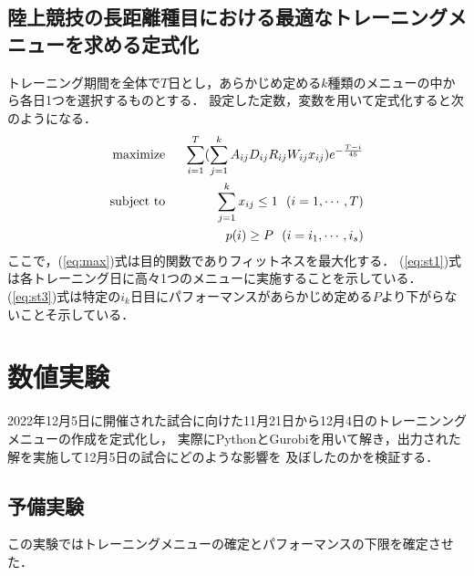 \documentclass[12pt,fleqn]{jreport}
\begin{document}
\section{陸上競技の長距離種目における最適なトレーニングメニューを求める定式化}
トレーニング期間を全体で$T$日とし，あらかじめ定める$k$種類のメニューの中から各日1つを選択するものとする．
設定した定数，変数を用いて定式化すると次のようになる．
\vspace{1cm}
\begin{eqnarray}
  \mathop{\rm maximize}&\ \ &\sum_{i=1}^T (\sum_{j=1}^k A_{ij}D_{ij}R_{ij}W_{ij}x_{ij})e^{-\frac{T-i}{45}}\label{eq:max}\\%
  \mathop{\rm subject\ to}&\ \ &\sum_{j=1}^k x_{ij}\leq 1\ \ (i=1,\cdots , T)\label{eq:st1}\\%
  &&p(i)\geq P\ \ (i=i_1,\cdots , i_s)\label{eq:st3}%
\end{eqnarray}
ここで，(\ref{eq:max})式は目的関数でありフィットネスを最大化する．
(\ref{eq:st1})式は各トレーニング日に高々1つのメニューに実施することを示している．
(\ref{eq:st3})式は特定の$i_k$日目にパフォーマンスがあらかじめ定める$P$より下がらないことそ示している．
\newpage
\chapter {数値実験}
\vspace{1cm}
2022年12月5日に開催された試合に向けた11月21日から12月4日のトレーニンングメニューの作成を定式化し，
実際にPythonとGurobiを用いて解き，出力された解を実施して12月5日の試合にどのような影響を
及ぼしたのかを検証する．
\section{予備実験}
この実験ではトレーニングメニューの確定とパフォーマンスの下限を確定させた．
\end{document}
